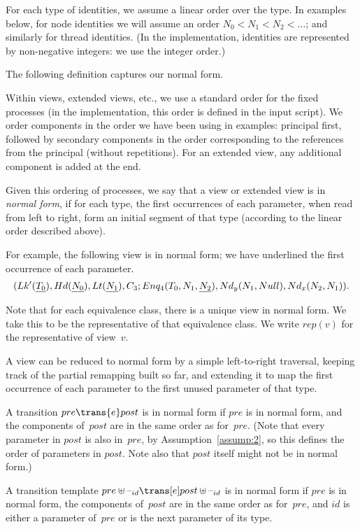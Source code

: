 For each type of identities, we assume a linear order over the type.  In
examples below, for node identities we will assume an order $N_0 < N_1 <
N_2 < \ldots$; and similarly for thread identities.  (In the implementation,
identities are represented by non-negative integers: we use the integer
order.)

The following definition captures our normal form.
%
\begin{definition}
Within views, extended views, etc., we use a standard order for the fixed
processes (in the implementation, this order is defined in the input script).
We order components in the order we have been using in examples: principal
first, followed by secondary components in the order corresponding to the
references from the principal (without repetitions).  For an extended view,
any additional component is added at the end.

Given this ordering of processes, we say that a view or extended view is in
\emph{normal form}, if for each type, the first occurrences of each parameter,
when read from left to right, form an initial segment of that type (according
to the linear order described above).   
\end{definition}

For example, the following view is in normal form; we have underlined the
first occurrence of each parameter.
\[
\begin{align}
(Lk'(\underline{T_0}), Hd(\underline{N_0}), 
    Lt(\underline{N_1}), C_3; 
  Enq_4(T_0, N_1, \underline{N_2}), Nd_y(N_1, Null),Nd_x(N_2, N_1)) .
\end{align}
\]

Note that for each equivalence class, there is a unique view in normal form.
We take this to be the representative of that equivalence class.  We write
$rep(v)$ for the representative of view~$v$. 

A view can be reduced to normal form by a simple left-to-right traversal,
keeping track of the partial remapping built so far, and extending it to map
the first occurrence of each parameter to the first unused parameter of that
type.


\begin{definition}
A transition $pre \trans{e} post$ is in normal form if $pre$ is in normal form,
and the components of~$post$ are in the same order as for~$pre$.  (Note that
every parameter in $post$ is also in~$pre$, by Assumption~\ref{assump:2}, so
this defines the order of parameters in $post$.  Note also that $post$ itself
might not be in normal form.)

A transition template $pre \uplus \hole{id} \trans[e] post \uplus \hole{id}$
is in normal form if $pre$ is in normal form, the components of~$post$ are in
the same order as for~$pre$, and $id$ is either a parameter of~$pre$ or is the
next parameter of its type.
\end{definition}

